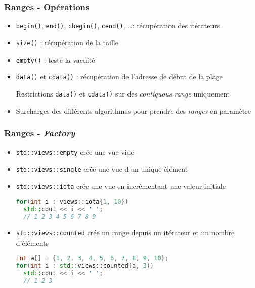 \documentclass[C++.tex]{subfiles}
\begin{document}
\begin{frame}
	\frametitle{Ranges - Opérations}
	\begin{itemize}
		\item \lstinline|begin()|, \lstinline|end()|, \lstinline|cbegin()|, \lstinline|cend()|, \ldots : récupération des itérateurs


		\item \lstinline|size()| : récupération de la taille
		\item \lstinline|empty()| : teste la vacuité
		\item \lstinline|data()| et \lstinline|cdata()| : récupération de l'adresse de début de la plage

		\begin{alertblock}{Restrictions}
			\lstinline|data()| et \lstinline|cdata()| sur des \textit{contiguous range} uniquement
		\end{alertblock}

		\item Surcharges des différents algorithmes pour prendre des \textit{ranges} en paramètre
	\end{itemize}
\end{frame}

\begin{frame}[fragile]
	\frametitle{Ranges - \textit{Factory}}
	\begin{itemize}
		\item \lstinline|std::views::empty| crée une vue vide
		\item \lstinline|std::views::single| crée une vue d'un unique élément
		\item \lstinline|std::views::iota| crée une vue en incrémentant une valeur initiale
	
		\begin{lstlisting}[language=C++]
for(int i : views::iota{1, 10})
  std::cout << i << ' ';
  // 1 2 3 4 5 6 7 8 9\end{lstlisting}
	
		\item \lstinline|std::views::counted| crée un range depuis un itérateur et un nombre d'éléments
	
		\begin{lstlisting}[language=C++]
int a[] = {1, 2, 3, 4, 5, 6, 7, 8, 9, 10};
for(int i : std::views::counted(a, 3))
  std::cout << i << ' ';
  // 1 2 3\end{lstlisting}
	\end{itemize}
\end{frame}
\end{document}
